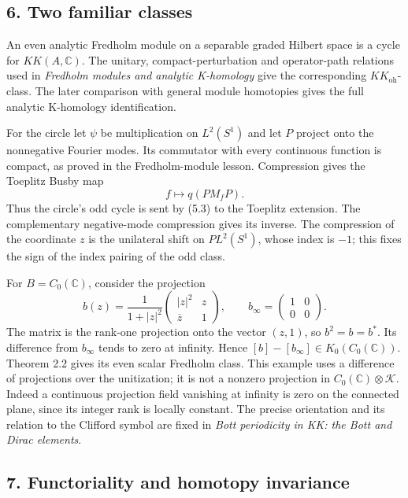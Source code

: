 \documentclass[
  11pt,
]{article}
\begin{document}
\subsection{6. Two familiar classes}\label{two-familiar-classes}

An even analytic Fredholm module on a separable graded Hilbert space is
a cycle for \(KK(A,\mathbb C)\). The unitary, compact-perturbation and
operator-path relations used in \emph{Fredholm modules and analytic
K-homology} give the corresponding \(KK_{\mathrm{oh}}\)-class. The later
comparison with general module homotopies gives the full analytic
K-homology identification.

For the circle let \(\psi\) be multiplication on \(L^2(S^1)\) and let
\(P\) project onto the nonnegative Fourier modes. Its commutator with
every continuous function is compact, as proved in the Fredholm-module
lesson. Compression gives the Toeplitz Busby map \[
f\longmapsto q(PM_fP).
\tag{6.1}
\] Thus the circle's odd cycle is sent by (5.3) to the Toeplitz
extension. The complementary negative-mode compression gives its
inverse. The compression of the coordinate \(z\) is the unilateral shift
on \(PL^2(S^1)\), whose index is \(-1\); this fixes the sign of the
index pairing of the odd class.

For \(B=C_0(\mathbb C)\), consider the projection \[
b(z)=\frac1{1+|z|^2}
\begin{pmatrix}|z|^2&z\\\overline z&1\end{pmatrix},
\qquad b_\infty=\begin{pmatrix}1&0\\0&0\end{pmatrix}.
\tag{6.2}
\] The matrix is the rank-one projection onto the vector \((z,1)\), so
\(b^2=b=b^*\). Its difference from \(b_\infty\) tends to zero at
infinity. Hence \([b]-[b_\infty]\in K_0(C_0(\mathbb C))\). Theorem 2.2
gives its even scalar Fredholm class. This example uses a difference of
projections over the unitization; it is not a nonzero projection in
\(C_0(\mathbb C)\otimes\mathcal K\). Indeed a continuous projection
field vanishing at infinity is zero on the connected plane, since its
integer rank is locally constant. The precise orientation and its
relation to the Clifford symbol are fixed in \emph{Bott periodicity in
KK: the Bott and Dirac elements}.

\subsection{7. Functoriality and homotopy
invariance}\label{functoriality-and-homotopy-invariance}
\end{document}
